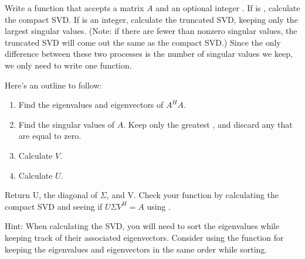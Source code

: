 \begin{problem}
Write a function  that accepts a matrix $A$ and an optional integer . 
If  is , calculate the compact SVD. If  is an integer, calculate the truncated SVD, keeping only the  largest singular values.
(Note: if there are fewer than  nonzero singular values, the truncated SVD will come out the same as the compact SVD.)
Since the only difference between these two processes is the number of singular values we keep, we only need to write one function.

Here's an outline to follow:

\begin{enumerate}
\item Find the eigenvalues and eigenvectors of $A^H A$.
\item Find the singular values of $A$. Keep only the greatest , and discard any that are equal to zero.
\item Calculate $V$.
\item Calculate $U$.
\end{enumerate}

Return U, the diagonal of $\Sigma$, and V.
Check your function by calculating the compact SVD and seeing if $U\Sigma V^H = A$ using .

Hint: When calculating the SVD, you will need to sort the eigenvalues while keeping track of their associated eigenvectors. 
Consider using the function  for keeping the eigenvalues and eigenvectors in the same order while sorting.
\label{prob:calc_svd}
\end{problem}

